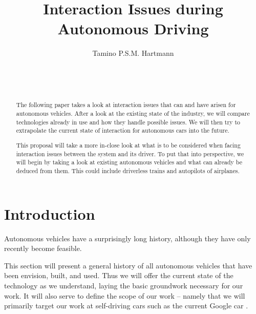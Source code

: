 \documentclass{acm_proc_article-sp}
\begin{document}

\title{Interaction Issues during Autonomous Driving}

\author{
\alignauthor
Tamino P.S.M. Hartmann\\
       \\
       \\
       \\
}

\maketitle
\begin{abstract}

The following paper takes a look at interaction issues that can and have arisen for autonomous vehicles.
After a look at the existing state of the industry, we will compare technologies already in use and how they handle possible issues.
We will then try to extrapolate the current state of interaction for autonomous cars into the future.

This proposal will take a more in-close look at what is to be considered when facing interaction issues between the system and its driver.
To put that into perspective, we will begin by taking a look at existing autonomous vehicles and what can already be deduced from them.
This could include driverless trains and autopilots of airplanes.

\end{abstract}


\section{Introduction}

Autonomous vehicles have a surprisingly long history, although they have only recently become feasible.

This section will present a general history of all autonomous vehicles that have been envision, built, and used.
Thus we will offer the current state of the technology as we understand, laying the basic groundwork necessary for our work.
It will also serve to define the scope of our work – namely that we will primarily target our work at self-driving cars such as the current Google car \cite{www:google_car}.
\end{document}
